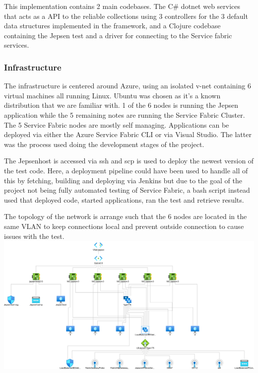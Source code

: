 \documentclass[a4paper,10pt,titlepage]{report}
\begin{document}
    This implementation contains 2 main codebases. The C\# dotnet web services that acts as a API to the reliable collections using 3 controllers for the 3 default data structures implemented in the framework, and a Clojure codebase containing the Jepsen test and a driver for connecting to the Service fabric services.

    \subsubsection{Infrastructure}
    The infrastructure is centered around Azure, using an isolated v-net containing 6 virtual machines all running Linux. Ubuntu was chosen as it's a known distribution that we are familiar with. 1 of the 6 nodes is running the Jepsen application while the 5 remaining notes are running the Service Fabric Cluster.
    The 5 Service Fabric nodes are mostly self managing. Applications can be deployed via either the Azure Service Fabric CLI\cite{servicefabriccli} or via Visual Studio\cite{servicefabricguide}. The latter was the process used doing the development stages of the project.

    The Jepsenhost is accessed via ssh and scp is used to deploy the newest version of the test code. Here, a deployment pipeline could have been used to handle all of this by fetching, building and deploying via Jenkins but due to the goal of the project not being fully automated testing of Service Fabric, a bash script instead used that deployed code, started applications, ran the test and retrieve results.

    The topology of the network is arrange such that the 6 nodes are located in the same VLAN to keep connections local and prevent outside connection to cause issues with the test.\\
    \includegraphics[scale=0.3]{images/topology.png}
    \\
\end{document}
